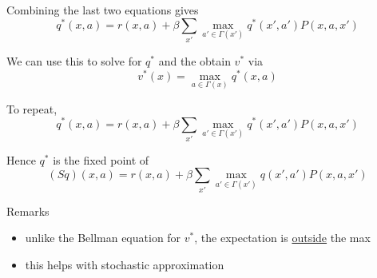 \documentclass[xcolor=dvipsnames]{beamer}  %
\newcommand{\1}{\mathbbm 1}
\begin{document}
\begin{frame}
    
    Combining the last two equations gives
    \begin{equation*}
        q^*(x,a) 
        = r(x, a) + \beta \sum_{x'} \max_{a' \in \Gamma(x')} q^*(x',a')
            P(x,a,x')
    \end{equation*}

    \vspace{0.5em}
    \vspace{0.5em}
    \vspace{0.5em}
    We can use this to solve for $q^*$ and the obtain $v^*$ via
    \begin{equation*}
        v^*(x)  = \max_{a \in \Gamma(x)} q^*(x,a)
    \end{equation*}
    

\end{frame}

\begin{frame}

    To repeat,
    \begin{equation*}
        q^*(x,a) 
        = r(x, a) 
            + \beta \sum_{x'} \max_{a' \in \Gamma(x')} q^*(x',a')P(x,a,x')
    \end{equation*}

    Hence $q^*$ is the fixed point of
    \begin{equation*}
        (S q)(x,a)
        =  r(x, a) 
            + \beta \sum_{x'} \max_{a' \in \Gamma(x')} q(x',a')P(x,a,x')
    \end{equation*}


    Remarks
    \begin{itemize}
        \item unlike the Bellman equation for $v^*$, the expectation is
            \underline{outside} the max
    \vspace{0.5em}
        \item this helps with stochastic approximation
    \end{itemize}

\end{frame}
\end{document}
